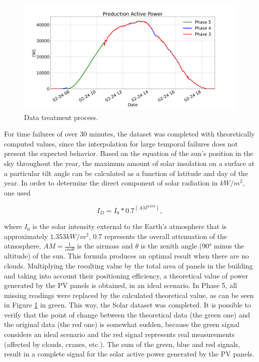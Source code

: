 \begin{figure}[h!]
    \centering
    \begin{center}
    \includegraphics[width=1\textwidth]{Images/int0.png}
    \caption{Data treatment process.}
    \label{int0}
    \end{center}
\end{figure}

For time failures of over 30 minutes, the dataset was completed with theoretically computed values, since the interpolation for large temporal failures does not present the expected behavior.
Based on the equation of the sun's position in the sky throughout the year, the maximum amount of solar insolation on a surface at a particular tilt angle can be calculated as a function of latitude and day of the year\cite{solar0}. In order to determine the direct component of solar radiation in $kW/m^2$, one used


\begin{equation}
     I_D = I_0*0.7^{(AM^{0.678})},
\label{solar}
\end{equation}

where $I_0$ is the solar intensity external to the Earth's atmosphere that is approximately $1.353 kW/m^2$, $0.7$ represents the overall attenuation of the atmosphere, $AM = \frac{1}{cos\theta}$ is the airmass and $\theta$ is the zenith angle (90° minus the altitude) of the sun. This formula produces an optimal result when there are no clouds. Multiplying the resulting value by the total area of panels in the building and taking into account their positioning efficiency, a theoretical value of power generated by the \ac{PV} panels is obtained, in an ideal scenario. In Phase 5, all missing readings were replaced by the calculated theoretical value, as can be seen in Figure \ref{int0} in green. This way, the Solar dataset was completed. It is possible to verify that the point of change between the theoretical data (the green one) and the original data (the red one) is somewhat sudden, because the green signal considers an ideal scenario and the red signal represents real measurements (affected by clouds, cranes, etc.). The sum of the green, blue and red signals, result in a complete signal for the solar active power generated by the \ac{PV} panels. 


